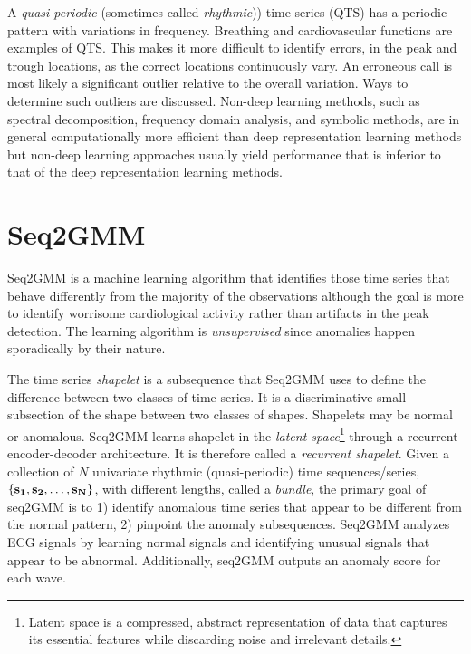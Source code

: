\documentclass[twoside,twocolumn]{article}
\begin{document}
A {\em quasi-periodic} (sometimes called {\em rhythmic}\cite{Yang2015})) time series (QTS) has a periodic pattern with variations in frequency.  Breathing and cardiovascular functions are examples of QTS.  This makes it more difficult to identify errors, in the peak and trough locations, as the correct locations continuously vary.  An erroneous call is most likely a significant outlier relative to the overall variation.  Ways to determine such outliers are discussed.  Non-deep learning methods, such as spectral decomposition, frequency domain analysis, and symbolic methods, are in general computationally more efficient than deep representation learning methods but non-deep learning approaches usually yield performance that is inferior to that of the deep representation learning methods.\cite{Yang2015}


\section{Seq2GMM}

Seq2GMM\cite{Yang2015} is a machine learning algorithm that identifies those time series that behave differently from the majority of the observations although the goal is more to identify worrisome cardiological activity rather than artifacts in the peak detection.  The learning algorithm is {\em unsupervised} since anomalies happen sporadically by their nature.

The time series {\em shapelet} is a subsequence that Seq2GMM uses to deﬁne the difference between two classes of time series.  It is a discriminative small subsection of the shape between two classes of shapes.  Shapelets may be normal or anomalous.  Seq2GMM learns shapelet in the {\em latent space}\footnote{Latent space is a compressed, abstract representation of data that captures its essential features while discarding noise and irrelevant details.} through a recurrent encoder-decoder architecture.  It is therefore called a {\em recurrent shapelet}.  Given a collection of $N$ univariate rhythmic (quasi-periodic)
time sequences/series, $\{\bf{s}_1, \bf{s}_2, \dots, \bf{s}_N\}$, with different lengths, called a {\em bundle}, the primary goal of seq2GMM is to 1) identify anomalous time series that appear to be different from the normal pattern, 2) pinpoint the anomaly subsequences.\cite{Yang2015}  Seq2GMM analyzes ECG signals by learning normal signals and identifying unusual signals that appear to be abnormal.  Additionally, seq2GMM outputs an anomaly score for each wave.
\end{document}
